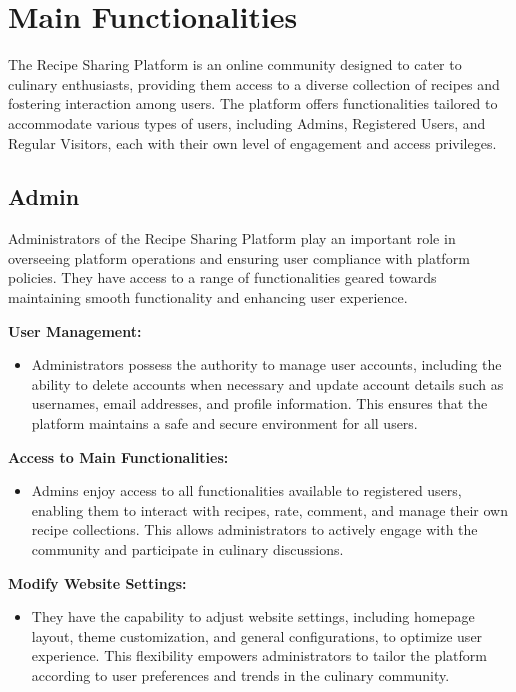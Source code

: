 \section{Main Functionalities}

The Recipe Sharing Platform is an online community designed to cater to culinary enthusiasts, providing them access to a diverse collection of recipes and fostering interaction among users. The platform offers functionalities tailored to accommodate various types of users, including Admins, Registered Users, and Regular Visitors, each with their own level of engagement and access privileges.

\subsection{Admin}

Administrators of the Recipe Sharing Platform play an important role in overseeing platform operations and ensuring user compliance with platform policies. They have access to a range of functionalities geared towards maintaining smooth functionality and enhancing user experience.

\textbf{User Management:}
\begin{itemize}
  \item Administrators possess the authority to manage user accounts, including the ability to delete accounts when necessary and update account details such as usernames, email addresses, and profile information. This ensures that the platform maintains a safe and secure environment for all users.
\end{itemize}

\textbf{Access to Main Functionalities:}
\begin{itemize}
  \item Admins enjoy access to all functionalities available to registered users, enabling them to interact with recipes, rate, comment, and manage their own recipe collections. This allows administrators to actively engage with the community and participate in culinary discussions.
\end{itemize}

\textbf{Modify Website Settings:}
\begin{itemize}
  \item They have the capability to adjust website settings, including homepage layout, theme customization, and general configurations, to optimize user experience. This flexibility empowers administrators to tailor the platform according to user preferences and trends in the culinary community.
\end{itemize}

